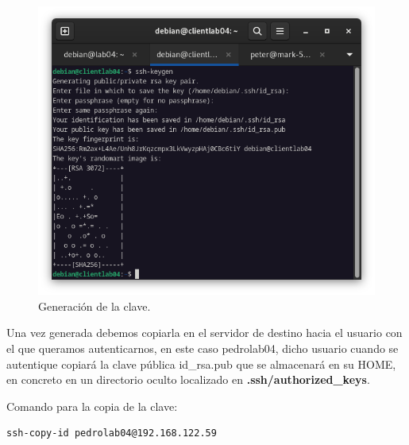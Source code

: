 \begin{figure}[H]
	\centering
	\includegraphics[scale=0.40]{06}
	\caption{Generación de la clave.}
\end{figure}

Una vez generada debemos copiarla en el servidor de destino hacia el usuario con el que queramos autenticarnos, en este caso pedrolab04, dicho usuario cuando se autentique copiará la clave pública id\_rsa.pub que se almacenará en su HOME, en concreto en un directorio oculto localizado en \textbf{.ssh/authorized\_keys}.
\vspace{5mm}

Comando para la copia de la clave:
\begin{lstlisting}[style=mybash]
ssh-copy-id pedrolab04@192.168.122.59
\end{lstlisting}


